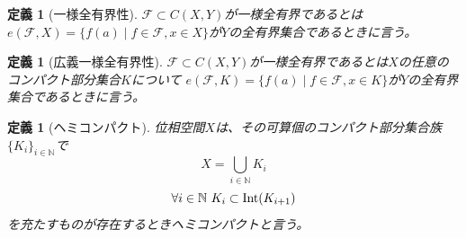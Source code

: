 \documentclass[leqno]{jsarticle}
\newtheorem{df}[thm]{定義}
\newcommand{\nn}{\mathbb{N}}
\newcommand{\nai}{\text{{\rm Int}}}
\begin{document}
\begin{df}[一様全有界性]
$\mathcal{F}\subset C(X,Y)$が一様全有界であるとは$e(\mathcal{F}, X)=\{f(a)\mid f\in \mathcal{F},x\in X\}$が$Y$の全有界集合であるときに言う。
\end{df}

\begin{df}[広義一様全有界性]
$\mathcal{F}\subset C(X,Y)$が一様全有界であるとは$X$の任意のコンパクト部分集合$K$について
$e(\mathcal{F}, K)=\{f(a)\mid f\in \mathcal{F},x\in K\}$が$Y$の全有界集合であるときに言う。
\end{df}


\begin{df}[ヘミコンパクト]
位相空間$X$は、その可算個のコンパクト部分集合族$\{K_i\}_{i\in \nn}$で
\[
X=\bigcup_{i\in \nn}K_i\]
\[
\forall i\in \nn\ K_i\subset \nai(K_{i+1})
\]
を充たすものが存在するときヘミコンパクトと言う。
\end{df}
\end{document}

